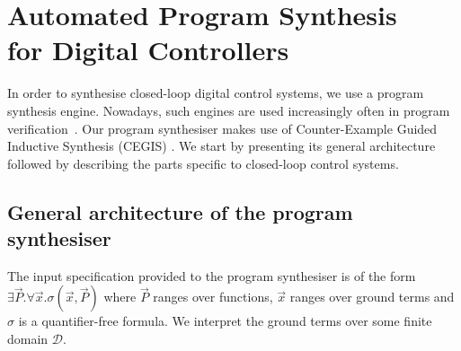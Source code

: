 \documentclass{sig-alternate-05-2015}
\newcommand{\red}[1]{{\color{red}#1}}
\begin{document}


\section{Automated Program Synthesis \\ for Digital Controllers}


In order to synthesise closed-loop digital control systems, we use a program
synthesis engine.  Nowadays, such engines are used increasingly often in
program verification~\cite{DBLP:conf/lpar/DavidKL15, DBLP:conf/cav/0001A14}. 
Our program synthesiser makes use of Counter-Example Guided Inductive
Synthesis (CEGIS) \cite{sketch}.  We start by presenting its general
architecture followed by describing the parts specific to closed-loop
control systems.


\subsection{General architecture of the program synthesiser}
\label{synthesiser-general}
%
% 
The input specification provided to the program synthesiser is of the form
$\exists \vec{P} .  \forall \vec{x}.  \sigma(\vec{x}, \vec{P})$ where
$\vec{P}$ ranges over functions, $\vec{x}$ ranges over ground terms and
$\sigma$ is a quantifier-free formula.  We interpret the ground terms over
some finite domain $\mathcal{D}$.
\end{document}
